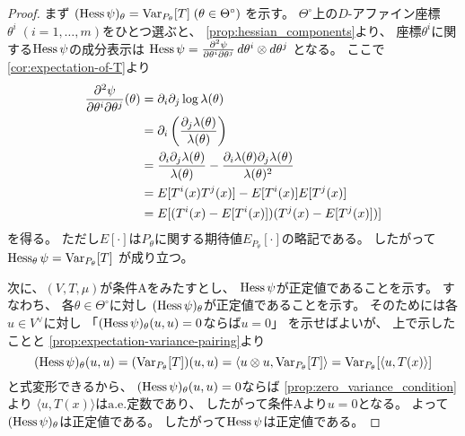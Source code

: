 \documentclass[report]{jlreq}
\begin{document}
\begin{proof}
    まず
    $(\operatorname{Hess} \psi)_\theta = \operatorname{Var}_{P_\theta}[T] \;
        (\theta \in \Theta^\circ)$
    を示す。
    $\Theta^\circ$上の$D$-アファイン座標
    $\theta^i \; (i = 1, \dots, m)$をひとつ選ぶと、
    \cref{prop:hessian_components}より、
    座標$\theta^i$に関する$\operatorname{Hess} \psi$の成分表示は
    $\operatorname{Hess}\psi
        = \frac{\partial^2 \psi}{\partial \theta^i \partial \theta^j}
        \, d\theta^i \otimes d\theta^j$
    となる。
    ここで\cref{cor:expectation-of-T}より
    \begin{alignat}{1}
        \frac{\partial^2 \psi}{\partial \theta^i \partial \theta^j}(\theta)
            &=
                \partial_i \partial_j \log \lambda(\theta)
                \\
            &=
                \partial_i \left({
                    \frac{\partial_j \lambda(\theta)}{\lambda(\theta)}
                }\right)
                \\
            &=
                \frac{
                    \partial_i \partial_j \lambda(\theta)
                }{
                    \lambda(\theta)
                }
                -
                \frac{
                    \partial_i \lambda(\theta)
                    \partial_j \lambda(\theta)
                }{
                    \lambda(\theta)^2
                }
                \\
            &=
                E[T^i(x) T^j(x)]
                -
                E[T^i(x)]
                E[T^j(x)]
                \\
            &=
                E[
                    (T^i(x) - E[T^i(x)])
                    (T^j(x) - E[T^j(x)])
                ]
    \end{alignat}
    を得る。
    ただし$E[\cdot]$は$P_\theta$に関する期待値$E_{P_\theta}[\cdot]$の略記である。
    したがって
    $\operatorname{Hess}_\theta \psi = \operatorname{Var}_{P_\theta}[T]$
    が成り立つ。

    次に、$(V, T, \mu)$が条件Aをみたすとし、
    $\operatorname{Hess}\psi$が正定値であることを示す。
    すなわち、
    各$\theta \in \Theta^\circ$に対し
    $(\operatorname{Hess}\psi)_\theta$が正定値であることを示す。
    そのためには各$u \in V^\vee$に対し
    「$(\operatorname{Hess}\psi)_\theta(u, u) = 0$ならば$u = 0$」
    を示せばよいが、
    上で示したことと
    \cref{prop:expectation-variance-pairing}より
    \begin{equation}
        (\operatorname{Hess}\psi)_\theta(u, u)
            = (\operatorname{Var}_{P_\theta}[T])(u, u)
            = \langle u \otimes u, \operatorname{Var}_{P_\theta}[T] \rangle
            = \operatorname{Var}_{P_\theta}[\langle u, T(x) \rangle]
    \end{equation}
    と式変形できるから、
    $(\operatorname{Hess}\psi)_\theta(u, u) = 0$ならば
    \cref{prop:zero_variance_condition}より
    $\langle u, T(x) \rangle$は$\text{a.e.}$定数であり、
    したがって条件Aより$u = 0$となる。
    よって$(\operatorname{Hess}\psi)_\theta$は正定値である。
    したがって$\operatorname{Hess}\psi$は正定値である。
\end{proof}
\end{document}
